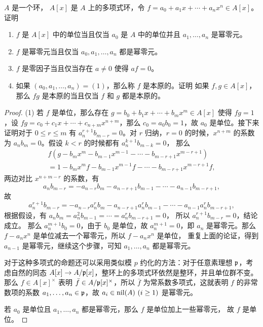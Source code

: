 \begin{problem}
  $A$ 是一个环， $A[x]$ 是 $A$ 上的多项式环，令
  $f=a_0+a_1x+\cdots+a_nx^n\in A[x]$。证明
  \begin{enumerate}
    \item $f$ 是 $A[x]$ 中的单位当且仅当 $a_0$ 是 $A$ 中的单位并且
    $a_1,\dots,a_n$ 是幂零元。
    \item $f$ 是幂零元当且仅当 $a_0,a_1,\dots,a_n$ 都是幂零元。
    \item $f$ 是零因子当且仅当存在 $a\neq 0$ 使得 $af=0$。
    \item 如果 $(a_0,a_1,\dots,a_n)=(1)$，那么称 $f$ 是本原的。证明
    如果 $f,g\in A[x]$，那么 $fg$ 是本原的当且仅当 $f$ 和 $g$ 都是本原的。
  \end{enumerate}
\end{problem}
\begin{proof}
  (1) 若 $f$ 是单位，那么存在 $g=b_0+b_1x+\cdots+b_mx^m\in A[x]$ 使得
  $fg=1$，设 $fg=c_0+c_1x+\cdots+c_{n+m}x^{n+m}$，那么
  $c_0=a_0b_0=1$，故 $a_0$ 是单位。接下来证明对于 $0\leq r\leq m$ 有
  $a_n^{r+1}b_{m-r}=0$。对 $r$ 归纳，$r=0$ 的时候，$x^{n+m}$ 的系数为
  $a_nb_m=0$。假设 $k<r$ 的时候都有 $a_n^{k+1}b_{m-k}=0$，
  那么
  \begin{gather*}
    f(g-b_mx^m-b_{m-1}x^{m-1}-\cdots-b_{m-r+1}x^{m-r+1})\\
    =1-b_mx^m f-b_{m-1}x^{m-1}f-\cdots-b_{m-r+1}x^{m-r+1}f, 
  \end{gather*}
  两边对比 $x^{n+m-r}$ 的系数，有
  \[
    a_nb_{m-r}=-a_{n-r}b_m-a_{n-r+1}b_{m-1}-\cdots-a_{n-1}b_{m-r+1},
  \]
  故
  \[
    a_n^{r+1}b_{m-r}=-a_{n-r}a_n^rb_m-a_{n-r+1}a_n^rb_{m-1}-\cdots-a_{n-1}a_n^rb_{m-r+1},
  \]
  根据假设，有 $a_nb_m=a_n^2b_{m-1}=\cdots=a_n^rb_{m-r+1}=0$，
  所以 $a_n^{r+1}b_{m-r}=0$，结论成立。
  那么 $a_n^{m+1}b_0=0$，由于 $b_0$ 是单位，故 $a_n^{m+1}=0$，即 $a_n$
  是幂零元。那么 $f-a_nx^n$ 是单位减去一个幂零元，所以 $f-a_nx^n$ 是单位，
  重复上面的论证，得到 $a_{n-1}$ 是幂零元，继续这个步骤，可知
  $a_1,\dots,a_n$ 都是幂零元。

  对于这种多项式的命题还可以采用类似模 $p$ 约化的方法：对于任意素理想 $\mathfrak{p}$，考虑自然的同态
  $A[x]\to A/\mathfrak{p}[x]$，整环上的多项式环依然是整环，并且单位群不变。
  那么 $f\in A[x]^\times $ 表明 $\bar{f}\in A/\mathfrak{p}[x]^\times $，所以 $\bar{f}$
  为常系数多项式，这就表明 $f$ 的非常数项的系数 $a_1,\dots,a_n\in\mathfrak{p}$，故
  $a_i\in\operatorname{nil}(A)\ (i\geq 1)$ 是幂零元。 

  若 $a_0$ 是单位且 $a_1,\dots,a_n$ 都是幂零元，那么 $f$ 是单位加上一些幂零元，
  故 $f$ 是单位。


\end{proof}

